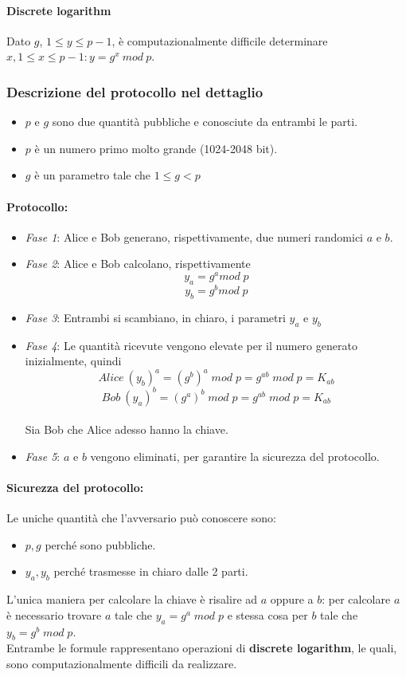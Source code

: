 \documentclass[a4paper,12pt]{article}
\begin{document}
\paragraph{Discrete logarithm} Dato $g$, $1 \leq y \leq p-1$, è computazionalmente difficile determinare  $x, 1 \leq x \leq p-1 : y = g^x\ mod\ p$.

\subsubsection{Descrizione del protocollo nel dettaglio}
\begin{itemize}
	\item $p$ e $g$ sono due quantità pubbliche e conosciute da entrambi le parti.
	\item $p$ è un numero primo molto grande (1024-2048 bit).
	\item $g$ è un parametro tale che $1 \leq g < p$
\end{itemize}
\paragraph{Protocollo:}
\begin{itemize}
	\item \textit{Fase 1}: Alice e Bob generano, rispettivamente, due numeri randomici $a$ e $b$.
	\item \textit{Fase 2}: Alice e Bob calcolano, rispettivamente $$y_a = g^a mod\;p$$ $$y_b = g^b mod\;p$$
	\item \textit{Fase 3}: Entrambi si scambiano, in chiaro, i parametri $y_a$ e $y_b$
	\item \textit{Fase 4}: Le quantità ricevute vengono elevate per il numero generato inizialmente, quindi $$Alice\:(y_b)^a = (g^b)^a\;mod\;p = g^{ab}\;mod\;p = K_{ab}$$ $$Bob\:(y_a)^b = (g^a)^b\;mod\;p = g^{ab}\;mod\;p = K_{ab}$$ \\
	Sia Bob che Alice adesso hanno la chiave.
	\item \textit{Fase 5}: $a$ e $b$ vengono eliminati, per garantire la sicurezza del protocollo.
\end{itemize}
\paragraph{Sicurezza del protocollo:} Le uniche quantità che l'avversario può conoscere sono:
\begin{itemize}
	\item $p,g$ perché sono pubbliche.
	\item $y_a,y_b$ perché trasmesse in chiaro dalle 2 parti.
\end{itemize}
L'unica maniera per calcolare la chiave è risalire ad $a$ oppure a $b$: per calcolare $a$ è necessario trovare
$a$ tale che $y_a = g^a\;mod\;p$ e stessa cosa per $b$ tale che $y_b = g^b\;mod\;p$. \\
Entrambe le formule rappresentano operazioni di \textbf{discrete logarithm}, le quali, sono computazionalmente difficili da realizzare.
\end{document}

